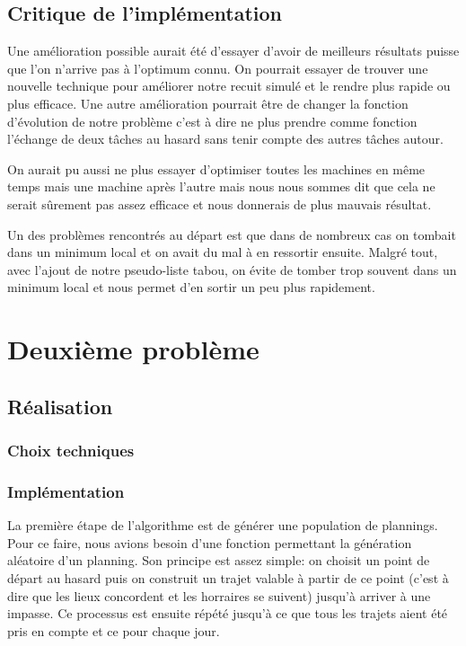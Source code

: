 \documentclass{report}
\begin{document}
\section{Critique de l'implémentation}
Une amélioration possible aurait été d'essayer d'avoir de meilleurs résultats puisse que l'on n'arrive pas à l'optimum connu. On pourrait essayer de trouver une nouvelle technique pour améliorer notre recuit simulé et le rendre plus rapide ou plus efficace. Une autre amélioration pourrait être de changer la fonction d'évolution de notre problème c'est à dire ne plus prendre comme fonction l'échange de deux tâches au hasard sans tenir compte des autres tâches autour.

On aurait pu aussi ne plus essayer d'optimiser toutes les machines en même temps mais une machine après l'autre mais nous nous sommes dit que cela ne serait sûrement pas assez efficace et nous donnerais de plus mauvais résultat.

Un des problèmes rencontrés au départ est que dans de nombreux cas on tombait dans un minimum local et on avait du mal à en ressortir ensuite.  Malgré tout, avec l'ajout de notre pseudo-liste tabou, on évite de tomber trop souvent dans un minimum local et nous permet d'en sortir un peu plus rapidement.

\newpage

\chapter{Deuxième problème}
\minitoc
\section{Réalisation}
\subsection{Choix techniques}

\subsection{Implémentation}

La première étape de l'algorithme est de générer une population de plannings. Pour ce faire, nous avions besoin d'une
fonction permettant la génération aléatoire d'un planning. Son principe est assez simple: on choisit un point de départ
au hasard puis on construit un trajet valable à partir de ce point (c'est à dire que les lieux concordent et les
horraires se suivent) jusqu'à arriver à une impasse. Ce processus est ensuite répété jusqu'à ce que tous les trajets
aient été pris en compte et ce pour chaque jour.
\end{document}
